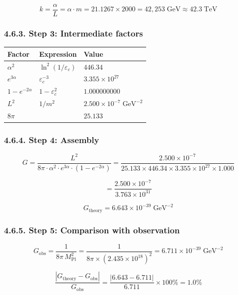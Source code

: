 \documentclass[
  11pt,
]{article}
\begin{document}
\[k = \frac{\alpha}{L} = \alpha \cdot m = 21.1267 \times 2000 = 42{,}253\;\text{GeV} \approx 42.3\;\text{TeV} \tag{189}\]

\hypertarget{step-3-intermediate-factors}{%
\subsubsection{4.6.3. Step 3: Intermediate
factors}\label{step-3-intermediate-factors}}

\begin{longtable}[]{@{}lll@{}}
\toprule
Factor & Expression & Value\tabularnewline
\midrule
\endhead
\(\alpha^2\) & \(\ln^2(1/\varepsilon_c)\) & \(446.34\)\tabularnewline
\(e^{3\alpha}\) & \(\varepsilon_c^{-3}\) &
\(3.355 \times 10^{27}\)\tabularnewline
\(1 - e^{-2\alpha}\) & \(1 - \varepsilon_c^2\) &
\(1.000000000\)\tabularnewline
\(L^2\) & \(1/m^2\) &
\(2.500 \times 10^{-7}\;\text{GeV}^{-2}\)\tabularnewline
\(8\pi\) & & \(25.133\)\tabularnewline
\bottomrule
\end{longtable}

\hypertarget{step-4-assembly}{%
\subsubsection{4.6.4. Step 4: Assembly}\label{step-4-assembly}}

\[G = \frac{L^2}{8\pi \cdot \alpha^2 \cdot e^{3\alpha} \cdot (1 - e^{-2\alpha})} = \frac{2.500 \times 10^{-7}}{25.133 \times 446.34 \times 3.355 \times 10^{27} \times 1.000} \tag{190}\]

\[= \frac{2.500 \times 10^{-7}}{3.763 \times 10^{31}} \tag{191}\]

\[\boxed{G_{\text{theory}} = 6.643 \times 10^{-39}\;\text{GeV}^{-2}} \tag{192}\]

\hypertarget{step-5-comparison-with-observation}{%
\subsubsection{4.6.5. Step 5: Comparison with
observation}\label{step-5-comparison-with-observation}}

\[G_{\text{obs}} = \frac{1}{8\pi\,M_{\text{Pl}}^2} = \frac{1}{8\pi \times (2.435 \times 10^{18})^2} = 6.711 \times 10^{-39}\;\text{GeV}^{-2} \tag{193}\]

\[\frac{|G_{\text{theory}} - G_{\text{obs}}|}{G_{\text{obs}}} = \frac{|6.643 - 6.711|}{6.711} \times 100\% = 1.0\% \tag{194}\]

\bigskip
\end{document}
